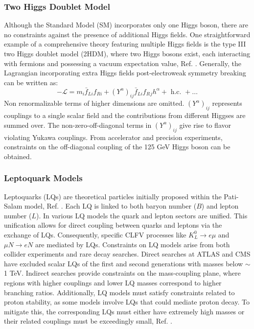 \subsubsection{Two Higgs Doublet Model}\label{2higgs}
Although the Standard Model (SM) incorporates only one Higgs boson, there are no constraints against the presence of additional Higgs fields. One straightforward example of a comprehensive theory featuring multiple Higgs fields is the type III two Higgs doublet model (2HDM), where two Higgs bosons exist, each interacting with fermions and possessing a vacuum expectation value, Ref. \cite{Harnik_2013}. Generally, the Lagrangian incorporating extra Higgs fields post-electroweak symmetry breaking can be written as:
\begin{equation}
-\mathscr{L}=m_i \bar{f}_{L i} f_{R i}+\left(Y^\alpha\right)_{i j} \bar{f}_{L i} f_R{ }_j h^\alpha+\text { h.c. }+\ldots
\end{equation}
Non renormalizable terms of higher dimensions are omitted. $(Y^\alpha)_{i j}$ represents couplings to a single scalar field and the contributions from different Higgses are summed over. The non-zero-off-diagonal terms in $(Y^\alpha)_{i j}$ give rise to flavor violating Yukawa couplings. From accelerator and precision experiments, constraints on the off-diagonal coupling of the 125 GeV Higgs boson can be obtained.
\subsubsection{Leptoquark Models}
Leptoquarks (LQs) are theoretical particles initially proposed within the Pati-Salam model, Ref. \cite{PhysRevD.10.275}. Each LQ is linked to both baryon number ($B$) and lepton number ($L$). In various LQ models the quark and lepton sectors are unified. This unification allows for direct coupling between quarks and leptons via the exchange of LQs. Consequently, specific CLFV processes like $K_L^0 \rightarrow e \mu$ and $\mu N \rightarrow e N$ are mediated by LQs. Constraints on LQ models arise from both collider experiments and rare decay searches. Direct searches at ATLAS and CMS have excluded scalar LQs of the first and second generations with masses below $\sim$1 TeV. Indirect searches provide constraints on the mass-coupling plane, where regions with higher couplings and lower LQ masses correspond to higher branching ratios. Additionally, LQ models must satisfy constraints related to proton stability, as some models involve LQs that could mediate proton decay. To mitigate this, the corresponding LQs must either have extremely high masses or their related couplings must be exceedingly small, Ref. \cite{DORSNER20161}.
